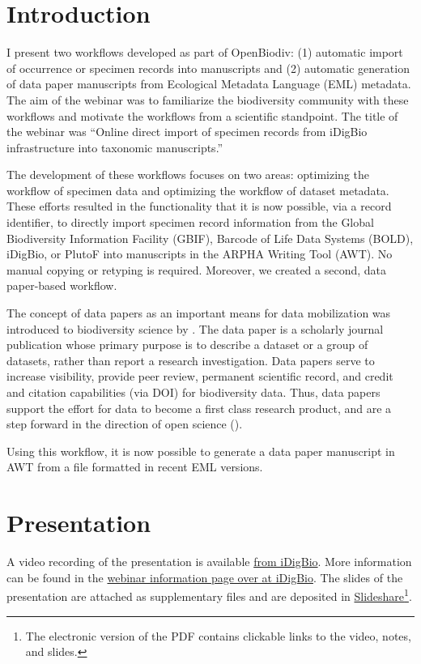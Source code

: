 \section{Introduction}

I present two workflows developed as part of OpenBiodiv: (1) automatic import of occurrence or specimen records into manuscripts and (2) automatic generation of data paper manuscripts from Ecological Metadata Language (EML) metadata. The aim of the webinar was to familiarize the biodiversity community with these workflows and motivate the workflows from a scientific standpoint. The title of the webinar was ``Online direct import of specimen records from iDigBio infrastructure into taxonomic manuscripts.''

The development of these workflows focuses on two areas: optimizing the workflow of specimen data and optimizing the workflow of dataset metadata. These efforts resulted in the functionality that it is now possible, via a record identifier, to directly import specimen record information from the Global Biodiversity Information Facility (GBIF), Barcode of Life Data Systems (BOLD), iDigBio, or PlutoF into manuscripts in the ARPHA Writing Tool (AWT). No manual copying or retyping is required. Moreover, we created a second, data paper-based workflow.

The concept of data papers as an important means for data mobilization was introduced to biodiversity science by \cite{chavan_data_2011}. The data paper is a scholarly journal publication whose primary purpose is to describe a dataset or a group of datasets, rather than report a research investigation. Data papers serve to increase visibility, provide peer review, permanent scientific record, and credit and citation capabilities (via DOI) for biodiversity data. Thus, data papers support the effort for data to become a first class research product, and are a step forward in the direction of open science (\cite{chavan_data_2011,chavan_cultural_2013}).

Using this workflow, it is now possible to generate a data paper manuscript in AWT from a file formatted in recent EML versions.

\section{Presentation}

A video recording of the presentation is available \href{http://idigbio.adobeconnect.com/p7sg0aym3e3/}{from iDigBio}. More information can be found in the \href{http://www.idigbio.org/content/online-direct-import-specimen-records-idigbio-infrastructure-taxonomic-manuscripts}{webinar information page over at iDigBio}. The slides of the presentation are attached as supplementary files and are deposited in \href{http://www.slideshare.net/ViktorSenderov/online-direct-import-of-specimen-records-from-idigbio-infrastructure-into-taxonomic-manuscripts}{Slideshare}\footnote{The electronic version of the PDF contains clickable links to the video, notes, and slides.}.

